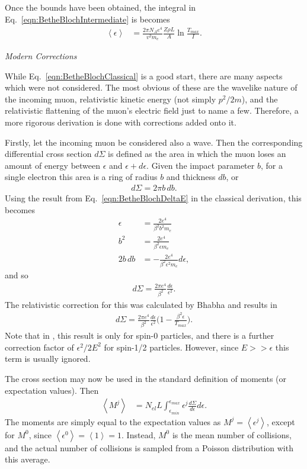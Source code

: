 Once the bounds have been obtained, the integral in Eq.~\eqref{eqn:BetheBlochIntermediate} is becomes
\begin{align}
\left<\epsilon\right> &= \frac{2\pi N_A e^4}{v^2 m_e} \frac{Z\rho L}{A} \ln{\frac{T_{max}}{I}} \label{eqn:BetheBlochClassical}.
\end{align}

\noindent \textit{\large{Modern Corrections}}

\iffalse
While Eq.~\eqref{eqn:BetheBlochClassical} is a good start, there are many aspects which were not considered. The most obvious of these are the wavelike nature of the incoming muon, relativistic kinetic energy (not simply $p^2/2m$), and the relativistic flattening of the muon's electric field just to name a few. Therefore, a more rigorous derivation is done with corrections added onto it.

Firstly, let the incoming muon be considered also a wave. Then the corresponding differential cross section $d\Sigma$ is defined as the area in which the muon loses an amount of energy between $\epsilon$ and $\epsilon+d\epsilon$. Given the impact parameter $b$, for a single electron this area is a ring of radius $b$ and thickness $db$, or \cite{bichsel1968,bichsel1988}
\begin{align*}
d\Sigma=2\pi b \, db.
\end{align*}
Using the result from Eq.~\eqref{eqn:BetheBlochDeltaE} in the classical derivation, this becomes
\begin{align*}
\epsilon &= \frac{2e^4}{\beta^2 b^2 m_e}\\
b^2 &= \frac{2e^4}{\beta^2 \epsilon m_e}\\
2b \, db &= -\frac{2e^4}{\beta^2 \epsilon^2 m_e}d\epsilon,
\end{align*}
and so
\begin{align*}
d\Sigma=\frac{2\pi e^4}{\beta^2} \frac{d\epsilon}{\epsilon ^2}.
\end{align*}
The relativistic correction for this was calculated by Bhabha \cite{uehling,bhabha} and results in
\begin{align*}
d\Sigma=\frac{2\pi e^4}{\beta^2} \frac{d\epsilon}{\epsilon ^2}\Big(1-\frac{\beta^2 \epsilon}{T_{max}}\Big).
\end{align*}
Note that in \cite{uehling}, this result is only for spin-0 particles, and there is a further correction factor of $\epsilon ^2 / 2E^2$ for spin-1/2 particles. However, since $E>>\epsilon$ this term is usually ignored.

The cross section may now be used in the standard definition of moments (or expectation values). Then
\begin{align} \label{eqn:StragglingMoments}
\left< M^j\right>&=N_{el} L \int_{\epsilon_{min}} ^{\epsilon_{max}} \epsilon^j \frac{d\Sigma}{d\epsilon} d\epsilon .
\end{align}
The moments are simply equal to the expectation values as $M^j=\left<\epsilon ^j \right>$, except for $M^0$, since $\left< \epsilon ^0 \right>=\left< 1 \right> = 1$. Instead, $M^0$ is the mean number of collisions, and the actual number of collisions is sampled from a Poisson distribution with this average.

